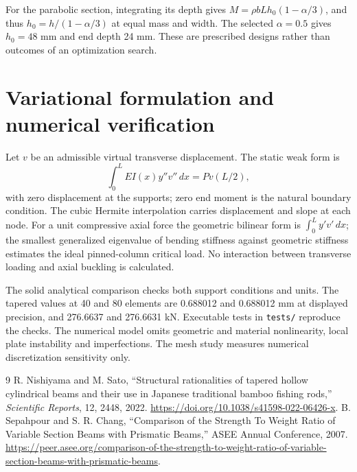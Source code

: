\documentclass[11pt]{article}
\begin{document}
For the parabolic section, integrating its depth gives $M=\rho bLh_0(1-\alpha/3)$, and thus $h_0=h/(1-\alpha/3)$ at equal mass and width. The selected $\alpha=0.5$ gives $h_0=48$ mm and end depth 24 mm. These are prescribed designs rather than outcomes of an optimization search.

\section{Variational formulation and numerical verification}
Let $v$ be an admissible virtual transverse displacement. The static weak form is
\begin{equation}\int_0^L EI(x)y''v''\,dx=P v(L/2),\end{equation}
with zero displacement at the supports; zero end moment is the natural boundary condition. The cubic Hermite interpolation carries displacement and slope at each node. For a unit compressive axial force the geometric bilinear form is $\int_0^L y'v'\,dx$; the smallest generalized eigenvalue of bending stiffness against geometric stiffness estimates the ideal pinned-column critical load. No interaction between transverse loading and axial buckling is calculated.

The solid analytical comparison checks both support conditions and units. The tapered values at 40 and 80 elements are 0.688012 and 0.688012 mm at displayed precision, and 276.6637 and 276.6631 kN. Executable tests in \texttt{tests/} reproduce the checks. The numerical model omits geometric and material nonlinearity, local plate instability and imperfections. The mesh study measures numerical discretization sensitivity only.

\begin{thebibliography}{9}
 R. Nishiyama and M. Sato, ``Structural rationalities of tapered hollow cylindrical beams and their use in Japanese traditional bamboo fishing rods,'' \emph{Scientific Reports}, 12, 2448, 2022. \url{https://doi.org/10.1038/s41598-022-06426-x}.
 B. Sepahpour and S. R. Chang, ``Comparison of the Strength To Weight Ratio of Variable Section Beams with Prismatic Beams,'' ASEE Annual Conference, 2007. \url{https://peer.asee.org/comparison-of-the-strength-to-weight-ratio-of-variable-section-beams-with-prismatic-beams}.
\end{thebibliography}
\end{document}
